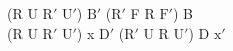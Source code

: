 (R U $\text{R}'$ $\text{U}'$) $\text{B}'$ ($\text{R}'$ F R $\text{F}'$) B\\
(R U $\text{R}'$ $\text{U}'$) x $\text{D}'$ ($\text{R}'$ U R $\text{U}'$) D $\text{x}'$\\
